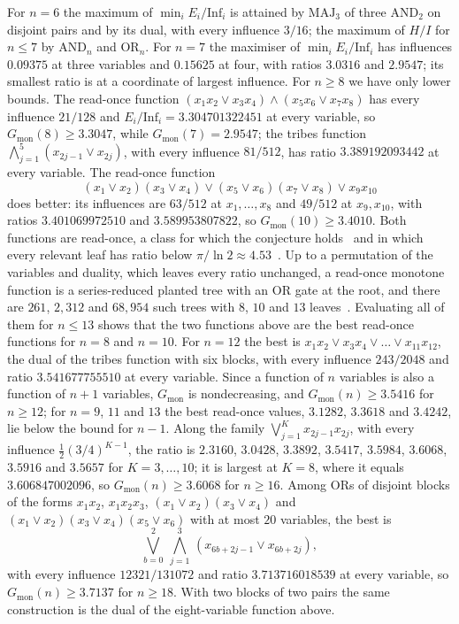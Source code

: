 \documentclass[11pt]{amsart}
\theoremstyle{remark}
\newcommand{\Inf}{\mathrm{Inf}}
\newcommand{\MAJ}{\mathrm{MAJ}}
\begin{document}
For $n=6$ the maximum of $\min_iE_i/\Inf_i$ is attained by $\MAJ_3$ of three $\mathrm{AND}_2$ on disjoint pairs and by
its dual, with every influence $3/16$; the maximum of $H/I$ for $n\le7$ by $\mathrm{AND}_n$ and $\mathrm{OR}_n$.
For $n=7$ the maximiser of $\min_iE_i/\Inf_i$ has influences $0.09375$ at three variables and $0.15625$ at four, with
ratios $3.0316$ and $2.9547$; its smallest ratio is at a coordinate of largest influence. For $n\ge8$ we have only
lower bounds. The read-once function
$(x_1x_2\vee x_3x_4)\wedge(x_5x_6\vee x_7x_8)$ has every influence $21/128$ and $E_i/\Inf_i=3.304701322451$ at every
variable, so $G_{\mathrm{mon}}(8)\ge3.3047$, while $G_{\mathrm{mon}}(7)=2.9547$; the tribes
function~\cite{BL85} $\bigwedge_{j=1}^{5}(x_{2j-1}\vee x_{2j})$, with every influence $81/512$, has ratio
$3.389192093442$ at every variable. The read-once function
\[
(x_1\vee x_2)(x_3\vee x_4)\vee(x_5\vee x_6)(x_7\vee x_8)\vee x_9x_{10}
\]
does better: its influences are $63/512$ at $x_1,\dots,x_8$ and $49/512$ at $x_9,x_{10}$, with ratios
$3.401069972510$ and $3.589953807822$, so $G_{\mathrm{mon}}(10)\ge3.4010$. Both functions are read-once, a class
for which the conjecture holds~\cite{OT13,CKLS} and in which every relevant leaf has ratio below
$\pi/\ln2\approx4.53$~\cite[Theorem~4.3]{Shm3}. Up to a permutation of the variables and duality, which leaves every
ratio unchanged, a read-once monotone function is a series-reduced planted tree with an OR gate at the root, and there
are $261$, $2{,}312$ and $68{,}954$ such trees with $8$, $10$ and $13$ leaves~\cite{OEIS669}. Evaluating all of them for
$n\le13$ shows that the two functions above are the best read-once functions for $n=8$ and $n=10$. For $n=12$ the best
is $x_1x_2\vee x_3x_4\vee\dots\vee x_{11}x_{12}$, the dual of the tribes function with six blocks, with every influence
$243/2048$ and ratio $3.541677755510$ at every variable. Since a function of $n$ variables is also a function of $n+1$
variables, $G_{\mathrm{mon}}$ is nondecreasing, and $G_{\mathrm{mon}}(n)\ge3.5416$ for $n\ge12$; for $n=9$, $11$ and
$13$ the best read-once values, $3.1282$, $3.3618$ and $3.4242$, lie below the bound for $n-1$. Along the family
$\bigvee_{j=1}^{K}x_{2j-1}x_{2j}$, with every influence $\frac12(3/4)^{K-1}$, the ratio is $2.3160$, $3.0428$, $3.3892$,
$3.5417$, $3.5984$, $3.6068$, $3.5916$ and $3.5657$ for $K=3,\dots,10$; it is largest at $K=8$, where it equals
$3.606847002096$, so $G_{\mathrm{mon}}(n)\ge3.6068$ for $n\ge16$. Among ORs of disjoint blocks of the forms
$x_1x_2$, $x_1x_2x_3$, $(x_1\vee x_2)(x_3\vee x_4)$ and $(x_1\vee x_2)(x_3\vee x_4)(x_5\vee x_6)$ with at most $20$
variables, the best is
\[
\bigvee_{b=0}^{2}\ \bigwedge_{j=1}^{3}\,(x_{6b+2j-1}\vee x_{6b+2j}),
\]
with every influence $12321/131072$ and ratio $3.713716018539$ at every variable, so $G_{\mathrm{mon}}(n)\ge3.7137$
for $n\ge18$. With two blocks of two pairs the same construction is the dual of the eight-variable function above.
\end{document}
